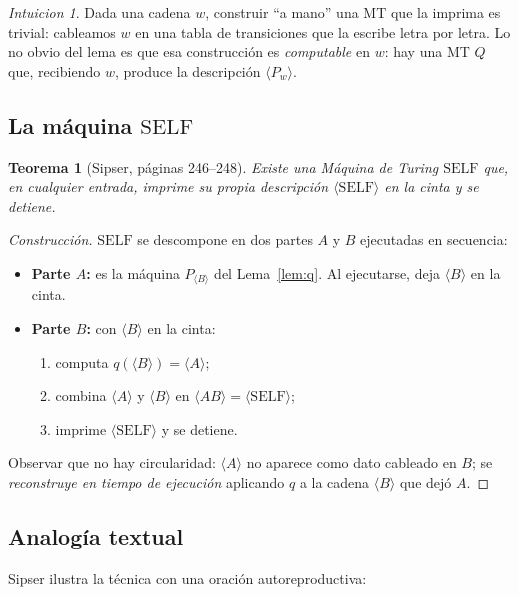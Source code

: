 \documentclass[11pt,a4paper]{article}
\theoremstyle{plain}
\newtheorem{teorema}{Teorema}[section]
\theoremstyle{definition}
\theoremstyle{remark}
\newtheorem*{intuicion}{Intuicion}
\newcommand{\enc}[1]{\langle #1\rangle}
\newcommand{\SELF}{\mathrm{SELF}}
\newcommand{\Pw}[1]{P_{#1}}
\begin{document}
\begin{intuicion}
Dada una cadena $w$, construir ``a mano'' una MT que la imprima es trivial:
cableamos $w$ en una tabla de transiciones que la escribe letra por letra.
Lo no obvio del lema es que esa construcci\'on es \emph{computable} en $w$:
hay una MT $Q$ que, recibiendo $w$, produce la descripci\'on $\enc{\Pw{w}}$.
\end{intuicion}

\subsection{La m\'aquina $\SELF$}

\begin{teorema}[Sipser, p\'aginas 246--248]
Existe una M\'aquina de Turing $\SELF$ que, en cualquier entrada, imprime su
propia descripci\'on $\enc{\SELF}$ en la cinta y se detiene.
\end{teorema}

\begin{proof}[Construcci\'on]
$\SELF$ se descompone en dos partes $A$ y $B$ ejecutadas en secuencia:

\begin{itemize}
  \item \textbf{Parte $A$:} es la m\'aquina $\Pw{\enc{B}}$ del
        Lema~\ref{lem:q}. Al ejecutarse, deja $\enc{B}$ en la cinta.
  \item \textbf{Parte $B$:} con $\enc{B}$ en la cinta:
        \begin{enumerate}
          \item computa $q(\enc{B}) = \enc{A}$;
          \item combina $\enc{A}$ y $\enc{B}$ en $\enc{AB}=\enc{\SELF}$;
          \item imprime $\enc{\SELF}$ y se detiene.
        \end{enumerate}
\end{itemize}

Observar que no hay circularidad: $\enc{A}$ no aparece como dato cableado en
$B$; se \emph{reconstruye en tiempo de ejecuci\'on} aplicando $q$ a la
cadena $\enc{B}$ que dej\'o $A$.
\end{proof}

\subsection{Analog\'ia textual}

Sipser ilustra la t\'ecnica con una oraci\'on autoreproductiva:
\end{document}
